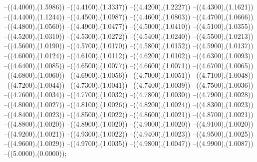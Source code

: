 {	--({\sx*(4.4000)},{\sy*(1.5986)})
	--({\sx*(4.4100)},{\sy*(1.3337)})
	--({\sx*(4.4200)},{\sy*(1.2227)})
	--({\sx*(4.4300)},{\sy*(1.1621)})
	--({\sx*(4.4400)},{\sy*(1.1244)})
	--({\sx*(4.4500)},{\sy*(1.0987)})
	--({\sx*(4.4600)},{\sy*(1.0803)})
	--({\sx*(4.4700)},{\sy*(1.0666)})
	--({\sx*(4.4800)},{\sy*(1.0560)})
	--({\sx*(4.4900)},{\sy*(1.0477)})
	--({\sx*(4.5000)},{\sy*(1.0410)})
	--({\sx*(4.5100)},{\sy*(1.0355)})
	--({\sx*(4.5200)},{\sy*(1.0310)})
	--({\sx*(4.5300)},{\sy*(1.0272)})
	--({\sx*(4.5400)},{\sy*(1.0240)})
	--({\sx*(4.5500)},{\sy*(1.0213)})
	--({\sx*(4.5600)},{\sy*(1.0190)})
	--({\sx*(4.5700)},{\sy*(1.0170)})
	--({\sx*(4.5800)},{\sy*(1.0152)})
	--({\sx*(4.5900)},{\sy*(1.0137)})
	--({\sx*(4.6000)},{\sy*(1.0124)})
	--({\sx*(4.6100)},{\sy*(1.0112)})
	--({\sx*(4.6200)},{\sy*(1.0102)})
	--({\sx*(4.6300)},{\sy*(1.0093)})
	--({\sx*(4.6400)},{\sy*(1.0085)})
	--({\sx*(4.6500)},{\sy*(1.0077)})
	--({\sx*(4.6600)},{\sy*(1.0071)})
	--({\sx*(4.6700)},{\sy*(1.0065)})
	--({\sx*(4.6800)},{\sy*(1.0060)})
	--({\sx*(4.6900)},{\sy*(1.0056)})
	--({\sx*(4.7000)},{\sy*(1.0051)})
	--({\sx*(4.7100)},{\sy*(1.0048)})
	--({\sx*(4.7200)},{\sy*(1.0044)})
	--({\sx*(4.7300)},{\sy*(1.0041)})
	--({\sx*(4.7400)},{\sy*(1.0039)})
	--({\sx*(4.7500)},{\sy*(1.0036)})
	--({\sx*(4.7600)},{\sy*(1.0034)})
	--({\sx*(4.7700)},{\sy*(1.0032)})
	--({\sx*(4.7800)},{\sy*(1.0030)})
	--({\sx*(4.7900)},{\sy*(1.0028)})
	--({\sx*(4.8000)},{\sy*(1.0027)})
	--({\sx*(4.8100)},{\sy*(1.0026)})
	--({\sx*(4.8200)},{\sy*(1.0024)})
	--({\sx*(4.8300)},{\sy*(1.0023)})
	--({\sx*(4.8400)},{\sy*(1.0023)})
	--({\sx*(4.8500)},{\sy*(1.0022)})
	--({\sx*(4.8600)},{\sy*(1.0021)})
	--({\sx*(4.8700)},{\sy*(1.0021)})
	--({\sx*(4.8800)},{\sy*(1.0020)})
	--({\sx*(4.8900)},{\sy*(1.0020)})
	--({\sx*(4.9000)},{\sy*(1.0020)})
	--({\sx*(4.9100)},{\sy*(1.0020)})
	--({\sx*(4.9200)},{\sy*(1.0021)})
	--({\sx*(4.9300)},{\sy*(1.0022)})
	--({\sx*(4.9400)},{\sy*(1.0023)})
	--({\sx*(4.9500)},{\sy*(1.0025)})
	--({\sx*(4.9600)},{\sy*(1.0029)})
	--({\sx*(4.9700)},{\sy*(1.0035)})
	--({\sx*(4.9800)},{\sy*(1.0047)})
	--({\sx*(4.9900)},{\sy*(1.0087)})
	--({\sx*(5.0000)},{\sy*(0.0000)});
}
\def\xwertee{
\fill[color=red] (0.0000,0) circle[radius={0.07/\skala}];
\fill[color=red] (0.5000,0) circle[radius={0.07/\skala}];
\fill[color=red] (1.0000,0) circle[radius={0.07/\skala}];
\fill[color=red] (1.5000,0) circle[radius={0.07/\skala}];
\fill[color=red] (2.0000,0) circle[radius={0.07/\skala}];
\fill[color=red] (2.5000,0) circle[radius={0.07/\skala}];
\fill[color=red] (3.0000,0) circle[radius={0.07/\skala}];
\fill[color=red] (3.5000,0) circle[radius={0.07/\skala}];
\fill[color=red] (4.0000,0) circle[radius={0.07/\skala}];
\fill[color=red] (4.5000,0) circle[radius={0.07/\skala}];
\fill[color=red] (5.0000,0) circle[radius={0.07/\skala}];
}
